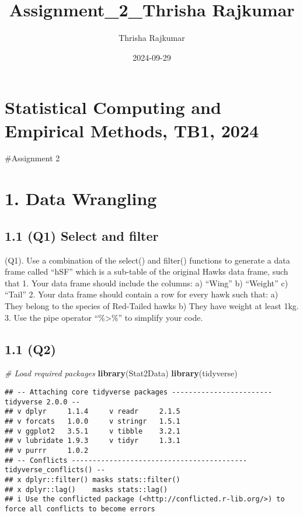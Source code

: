 \documentclass[
]{article}
\title{Assignment\_2\_Thrisha Rajkumar}
\author{Thrisha Rajkumar}
\date{2024-09-29}
\newenvironment{Shaded}{\begin{snugshade}}{\end{snugshade}}
\newcommand{\CommentTok}[1]{\textcolor[rgb]{0.56,0.35,0.01}{\textit{#1}}}
\newcommand{\FunctionTok}[1]{\textcolor[rgb]{0.13,0.29,0.53}{\textbf{#1}}}
\newcommand{\NormalTok}[1]{#1}
\begin{document}
\maketitle

\section{Statistical Computing and Empirical Methods, TB1,
2024}\label{statistical-computing-and-empirical-methods-tb1-2024}

\#Assignment 2

\section{1. Data Wrangling}\label{data-wrangling}

\subsection{1.1 (Q1) Select and filter}\label{q1-select-and-filter}

(Q1). Use a combination of the select() and filter() functions to
generate a data frame called ``hSF'' which is a sub-table of the
original Hawks data frame, such that 1. Your data frame should include
the columns: a) ``Wing'' b) ``Weight'' c) ``Tail'' 2. Your data frame
should contain a row for every hawk such that: a) They belong to the
species of Red-Tailed hawks b) They have weight at least 1kg. 3. Use the
pipe operator ``\%\textgreater\%'' to simplify your code.

\subsection{1.1 (Q2)}\label{q2}

\begin{Shaded}
\begin{Highlighting}[]
\CommentTok{\# Load required packages}
\FunctionTok{library}\NormalTok{(Stat2Data)}
\FunctionTok{library}\NormalTok{(tidyverse)}
\end{Highlighting}
\end{Shaded}

\begin{verbatim}
## -- Attaching core tidyverse packages ------------------------ tidyverse 2.0.0 --
## v dplyr     1.1.4     v readr     2.1.5
## v forcats   1.0.0     v stringr   1.5.1
## v ggplot2   3.5.1     v tibble    3.2.1
## v lubridate 1.9.3     v tidyr     1.3.1
## v purrr     1.0.2     
## -- Conflicts ------------------------------------------ tidyverse_conflicts() --
## x dplyr::filter() masks stats::filter()
## x dplyr::lag()    masks stats::lag()
## i Use the conflicted package (<http://conflicted.r-lib.org/>) to force all conflicts to become errors
\end{verbatim}
\end{document}
